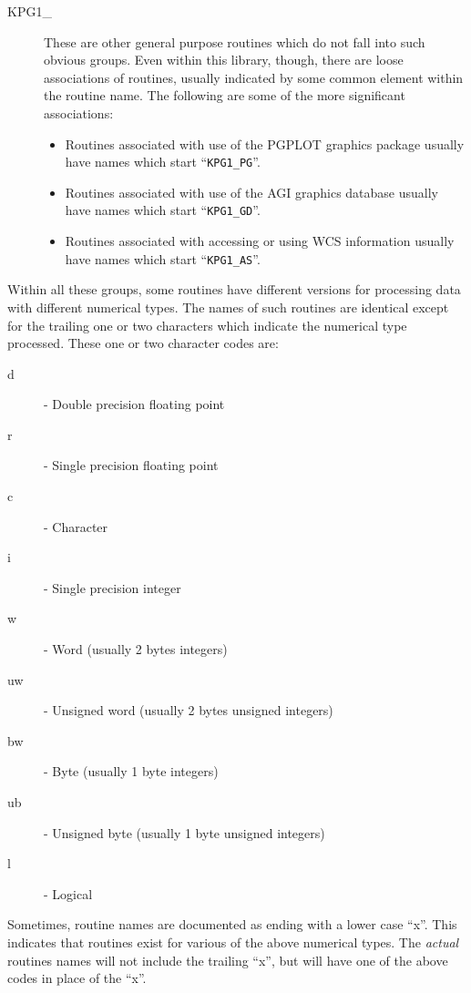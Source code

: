 \begin{description}
\item [KPG1\_] These are other general purpose routines which do not fall
into such obvious groups.  Even within this library, though, there are
loose associations of routines, usually indicated by some common element
within the routine name. The following are some of the more significant
associations:

\begin{itemize}
\item Routines associated with use of the PGPLOT graphics package usually
have names which start ``{\tt KPG1\_PG}''.
\item Routines associated with use of the AGI graphics database usually
have names which start ``{\tt KPG1\_GD}''.
\item Routines associated with accessing or using WCS information usually 
have names which start ``{\tt KPG1\_AS}''.
\end{itemize}

\end{description}

Within all these groups, some routines have different versions for
processing data with different numerical types. The names of such
routines are identical except for the trailing one or two characters
which indicate the numerical type processed. These one or two character
codes are:

\begin{description}
\item [d] - Double precision floating point
\item [r] - Single precision floating point
\item [c] - Character
\item [i] - Single precision integer
\item [w] - Word (usually 2 bytes integers)
\item [uw] - Unsigned word (usually 2 bytes unsigned integers)
\item [bw] - Byte (usually 1 byte integers)
\item [ub] - Unsigned byte (usually 1 byte unsigned integers)
\item [l] - Logical 
\end{description}

Sometimes, routine names are documented as ending with a lower case
``x''. This indicates that routines exist for various of the above
numerical types. The \emph{actual} routines names will not include the trailing
``x'', but will have one of the above codes in place of the ``x''.

